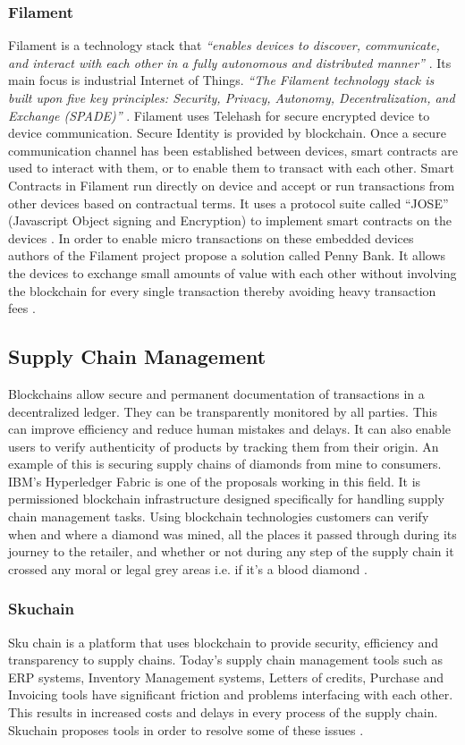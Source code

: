 \subsubsection{Filament} \label{Filament}
Filament is a technology stack that \textit{“enables devices to discover, communicate, and interact with each other in a fully autonomous and distributed manner”} \cite{misc:006}. Its main focus is industrial Internet of Things. \textit{“The Filament technology stack is built upon five key principles: Security, Privacy, Autonomy, Decentralization, and Exchange (SPADE)”} \cite{misc:006}. Filament uses Telehash for secure encrypted device to device communication. Secure Identity is provided by blockchain. Once a secure communication channel has been established between devices, smart contracts are used to interact with them, or to enable them to transact with each other. Smart Contracts in Filament run directly on device and accept or run transactions from other devices based on contractual terms. It uses a protocol suite called “JOSE” (Javascript Object signing and Encryption) to implement smart contracts on the devices \cite{misc:007}. In order to enable micro transactions on these embedded devices authors of the Filament project propose a solution called Penny Bank. It allows the devices to exchange small amounts of value with each other without involving the blockchain for every single transaction thereby avoiding heavy transaction fees \cite{misc:006}.

\subsection{Supply Chain Management}
Blockchains allow secure and permanent documentation of transactions in a decentralized ledger. They can be transparently monitored by all parties. This can improve efficiency and reduce human mistakes and delays. It can also enable users to verify authenticity of products by tracking them from their origin. An example of this is securing supply chains of diamonds from mine to consumers. IBM’s Hyperledger Fabric is one of the proposals working in this field. It is permissioned blockchain infrastructure designed specifically for handling supply chain management tasks. Using blockchain technologies customers can verify when and where a diamond was mined, all the places it passed through during its journey to the retailer, and whether or not during any step of the supply chain it crossed any moral or legal grey areas i.e. if it’s a blood diamond \cite{misc:014}.
\subsubsection{Skuchain}
Sku chain is a platform that uses blockchain to provide security, efficiency and transparency to supply chains. Today’s supply chain management tools such as ERP systems, Inventory Management systems, Letters of credits, Purchase and Invoicing tools have significant friction and problems interfacing with each other. This results in increased costs and delays in every process of the supply chain. Skuchain proposes tools in order to resolve some of these issues \cite{misc:015}.

